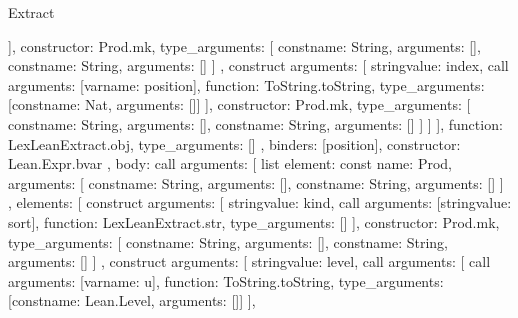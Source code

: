 \begin{lexlean}{Extract}
\begin{toolingmodule}
{{{{{{{{                        }
                      ],
                      constructor: Prod.mk,
                      type_arguments: [
                        const{name: String, arguments: []},
                        const{name: String, arguments: []}
                      ]
                    },
                    construct{
                      arguments: [
                        string{value: index},
                        call{
                          arguments: [var{name: position}],
                          function: ToString.toString,
                          type_arguments: [const{name: Nat, arguments: []}]
                        }
                      ],
                      constructor: Prod.mk,
                      type_arguments: [
                        const{name: String, arguments: []},
                        const{name: String, arguments: []}
                      ]
                    }
                  ]
                }
              ],
              function: LexLeanExtract.obj,
              type_arguments: []
            },
            binders: [position],
            constructor: Lean.Expr.bvar
          },
          {
            body: call{
              arguments: [
                list{
                  element: const{
                    name: Prod,
                    arguments: [
                      const{name: String, arguments: []},
                      const{name: String, arguments: []}
                    ]
                  },
                  elements: [
                    construct{
                      arguments: [
                        string{value: kind},
                        call{
                          arguments: [string{value: sort}],
                          function: LexLeanExtract.str,
                          type_arguments: []
                        }
                      ],
                      constructor: Prod.mk,
                      type_arguments: [
                        const{name: String, arguments: []},
                        const{name: String, arguments: []}
                      ]
                    },
                    construct{
                      arguments: [
                        string{value: level},
                        call{
                          arguments: [
                            call{
                              arguments: [var{name: u}],
                              function: ToString.toString,
                              type_arguments: [const{name: Lean.Level, arguments: []}]
                            }
                          ],
}}}}}}}}
\end{toolingmodule}
\end{lexlean}

